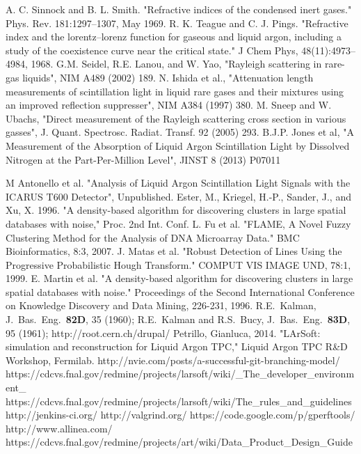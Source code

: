 \documentclass[12pt]{elsarticle}
\begin{document}
\begin{thebibliography}{99}
 A. C. Sinnock and B. L. Smith. "Refractive indices of the condensed inert gases." Phys. Rev. 181:1297–1307, May 1969.   R. K. Teague and C. J. Pings. "Refractive index and the lorentz–lorenz function for gaseous and liquid argon, including a study of the coexistence curve near the critical state." J Chem Phys, 48(11):4973–4984, 1968.
 G.M. Seidel, R.E. Lanou, and W. Yao, "Rayleigh scattering in rare-gas liquids", NIM A489 (2002) 189.   N. Ishida et al., "Attenuation length measurements of scintillation light in liquid rare gases and their mixtures using an improved reflection suppresser", NIM A384 (1997) 380. M. Sneep and W. Ubachs, "Direct measurement of the Rayleigh scattering cross section in various gasses", J. Quant. Spectrosc. Radiat. Transf. 92 (2005) 293.
 B.J.P. Jones et al, "A Measurement of the Absorption of Liquid Argon Scintillation Light by Dissolved Nitrogen at the Part-Per-Million Level", JINST 8 (2013) P07011

 M Antonello et al.  "Analysis of Liquid Argon Scintillation Light Signals with the ICARUS T600 Detector", Unpublished.
 Ester, M., Kriegel, H.-P., Sander, J., and Xu, X. 1996. "A density-based algorithm for discovering clusters in large spatial databases with noise," Proc. 2nd Int. Conf.
 L. Fu et al. "FLAME, A Novel Fuzzy Clustering Method for the Analysis of DNA Microarray Data." BMC Bioinformatics, 8:3, 2007.
 J. Matas et al. "Robust Detection of Lines Using the Progressive Probabilistic Hough Transform." COMPUT VIS IMAGE UND, 78:1, 1999.
 E. Martin et al. "A density-based algorithm for discovering clusters in large spatial databases with noise." Proceedings of the Second International Conference on Knowledge Discovery and Data Mining, 226-231, 1996. 
R.E.~Kalman, J.~Bas.~Eng.~{\bf 82D}, 35 (1960);
R.E.~Kalman and R.S.~Bucy, J.~Bas.~Eng.~{\bf 83D}, 95 (1961);
 http://root.cern.ch/drupal/
 Petrillo, Gianluca, 2014. "LArSoft: simulation and reconstruction for Liquid Argon TPC," Liquid Argon TPC R\&D Workshop, Fermilab.
 http://nvie.com/posts/a-successful-git-branching-model/
 https://cdcvs.fnal.gov/redmine/projects/larsoft/wiki/\_The\_developer\_environment\_
 https://cdcvs.fnal.gov/redmine/projects/larsoft/wiki/The\_rules\_and\_guidelines
 http://jenkins-ci.org/
 http://valgrind.org/
 https://code.google.com/p/gperftools/
 http://www.allinea.com/
 https://cdcvs.fnal.gov/redmine/projects/art/wiki/Data\_Product\_Design\_Guide

\end{thebibliography}
\clearpage 
\end{document}
